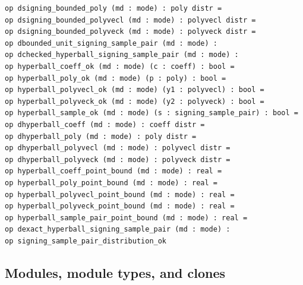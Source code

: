 \begin{lstlisting}[language=EasyCrypt,basicstyle=\ttfamily\tiny]
op dsigning_bounded_poly (md : mode) : poly distr =
op dsigning_bounded_polyvecl (md : mode) : polyvecl distr =
op dsigning_bounded_polyveck (md : mode) : polyveck distr =
op dbounded_unit_signing_sample_pair (md : mode) :
op dchecked_hyperball_signing_sample_pair (md : mode) :
op hyperball_coeff_ok (md : mode) (c : coeff) : bool =
op hyperball_poly_ok (md : mode) (p : poly) : bool =
op hyperball_polyvecl_ok (md : mode) (y1 : polyvecl) : bool =
op hyperball_polyveck_ok (md : mode) (y2 : polyveck) : bool =
op hyperball_sample_ok (md : mode) (s : signing_sample_pair) : bool =
op dhyperball_coeff (md : mode) : coeff distr =
op dhyperball_poly (md : mode) : poly distr =
op dhyperball_polyvecl (md : mode) : polyvecl distr =
op dhyperball_polyveck (md : mode) : polyveck distr =
op hyperball_coeff_point_bound (md : mode) : real =
op hyperball_poly_point_bound (md : mode) : real =
op hyperball_polyvecl_point_bound (md : mode) : real =
op hyperball_polyveck_point_bound (md : mode) : real =
op hyperball_sample_pair_point_bound (md : mode) : real =
op dexact_hyperball_signing_sample_pair (md : mode) :
op signing_sample_pair_distribution_ok
\end{lstlisting}

\subsection*{Modules, module types, and clones}
\begin{lstlisting}[language=EasyCrypt,basicstyle=\ttfamily\tiny]
\end{lstlisting}

